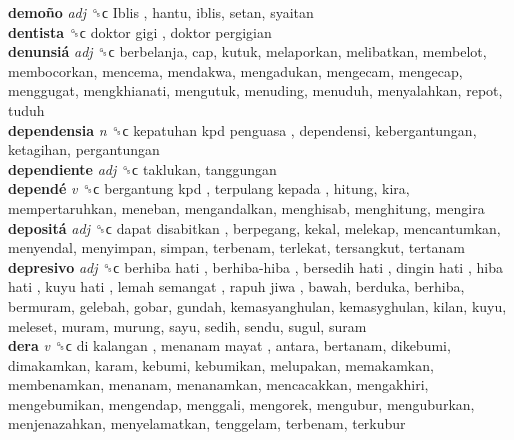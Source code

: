 \textbf{demoño} \emph{adj}  ␝ϲ   Iblis , hantu, iblis, setan, syaitan  \\
\textbf{dentista} ␝ϲ   doktor gigi ,  doktor pergigian   \\
\textbf{denunsiá} \emph{adj}  ␝ϲ  berbelanja, cap, kutuk, melaporkan, melibatkan, membelot, membocorkan, mencema, mendakwa, mengadukan, mengecam, mengecap, menggugat, mengkhianati, mengutuk, menuding, menuduh, menyalahkan, repot, tuduh  \\
\textbf{dependensia} \emph{n}  ␝ϲ   kepatuhan kpd penguasa , dependensi, kebergantungan, ketagihan, pergantungan  \\
\textbf{dependiente} \emph{adj}  ␝ϲ  taklukan, tanggungan  \\
\textbf{dependé} \emph{v}  ␝ϲ   bergantung kpd ,  terpulang kepada , hitung, kira, mempertaruhkan, meneban, mengandalkan, menghisab, menghitung, mengira  \\
\textbf{depositá} \emph{adj}  ␝ϲ   dapat disabitkan , berpegang, kekal, melekap, mencantumkan, menyendal, menyimpan, simpan, terbenam, terlekat, tersangkut, tertanam  \\
\textbf{depresivo} \emph{adj}  ␝ϲ   berhiba hati ,  berhiba-hiba ,  bersedih hati ,  dingin hati ,  hiba hati ,  kuyu hati ,  lemah semangat ,  rapuh jiwa , bawah, berduka, berhiba, bermuram, gelebah, gobar, gundah, kemasyanghulan, kemasyghulan, kilan, kuyu, meleset, muram, murung, sayu, sedih, sendu, sugul, suram  \\
\textbf{dera} \emph{v}  ␝ϲ   di kalangan ,  menanam mayat , antara, bertanam, dikebumi, dimakamkan, karam, kebumi, kebumikan, melupakan, memakamkan, membenamkan, menanam, menanamkan, mencacakkan, mengakhiri, mengebumikan, mengendap, menggali, mengorek, mengubur, menguburkan, menjenazahkan, menyelamatkan, tenggelam, terbenam, terkubur  \\
